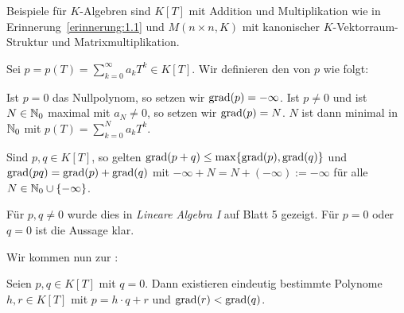 Beispiele für $K$-Algebren sind $K[T]$ mit Addition und Multiplikation wie in Erinnerung~\ref{erinnerung:1.1} und $M(n\times n,K)$ mit kanonischer $K$-Vektorraum-Struktur und Matrixmultiplikation.

\begin{definition}[Grad]
	\label{def:1.3}
	Sei $p = p(T) = \sum_{k=0}^{\infty} a_k T^{k} \in K[T]$.
	Wir definieren den  von $p$ wie folgt:
	
	Ist $p = 0$ das Nullpolynom, so setzen wir $\operatorname{grad}(p) = -\infty$.
	Ist $p \neq 0$ und ist $N \in \mathbb{N}_0$ maximal mit $a_N \neq 0$, so setzen wir $\operatorname{grad}(p) = N$.
	$N$ ist dann minimal in $\mathbb{N}_0$ mit $p(T) = \sum_{k=0}^{N} a_k T^{k}$.
\end{definition}

\begin{lemma}
	\label{lemma:1.4}
	Sind $p,q \in K[T]$, so gelten $\operatorname{grad}(p+q) \leq \max\{\operatorname{grad}(p),\operatorname{grad}(q)\}$ und $\operatorname{grad}(pq) = \operatorname{grad}(p)+\operatorname{grad}(q)$ mit $-\infty + N = N + (-\infty) := -\infty$ für alle $N \in \mathbb{N}_0 \cup \{-\infty\}$.
\end{lemma}

\begin{beweis}
	Für $p,q \neq 0$ wurde dies in \textit{Lineare Algebra I} auf Blatt 5 gezeigt.
	Für $p = 0$ oder $q=0$ ist die Aussage klar. 
\end{beweis}

Wir kommen nun zur :
\begin{satz}
	\label{satz:1.5}
	Seien $p,q \in K[T]$ mit $q=0$.
	Dann existieren eindeutig bestimmte Polynome $h,r \in K[T]$ mit $p=h\cdot q+r$ und $\operatorname{grad}(r) < \operatorname{grad}(q)$.
\end{satz}

